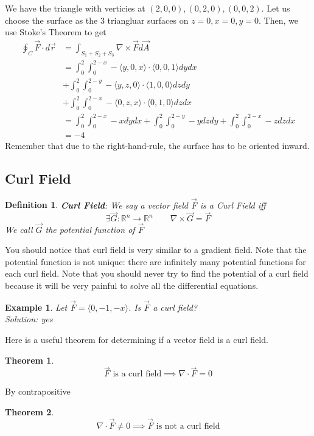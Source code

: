 \documentclass[11pt]{article}
\newtheorem{thm}{Theorem}
\newtheorem{defn}{Definition}
\newtheorem{ex}{Example}
\begin{document}
      We have the triangle with verticies at $(2,0,0), (0,2,0), (0,0,2)$. Let us choose the surface as the 3 triangluar surfaces on $z=0, x=0, y=0$. Then, we use
      Stoke's Theorem to get
      \begin{align*}
        \oint_{C} \vec{F} \cdot d\vec{r}
        &= \int_{S_{1}+S_{2}+S_{3}} \nabla \times \vec{F} d\vec{A} \\
        &=
          \int_{0}^{2}\int_{0}^{2-x} -\langle y,0,x \rangle \cdot \langle 0,0,1\rangle dy dx\\
          &+\int_{0}^{2}\int_{0}^{2-y} -\langle y,z,0 \rangle \cdot \langle 1,0,0\rangle dz dy\\
          &+\int_{0}^{2}\int_{0}^{2-x} -\langle 0,z,x \rangle \cdot \langle 0,1,0\rangle dz dx\\
        &=
          \int_{0}^{2}\int_{0}^{2-x} -x dy dx
          +\int_{0}^{2}\int_{0}^{2-y} - y dz dy
          +\int_{0}^{2}\int_{0}^{2-x} -z dz dx\\
        &= \boxed{-4}
        \end{align*}
        Remember that due to the right-hand-rule, the surface has to be oriented inward.
        \subsection{Curl Field}
        \begin{defn}
          \textbf{Curl Field}: We say a vector field $\vec{F}$ is a Curl Field iff
          \[\exists \vec{G}: \mathbb{R}^{n} \to \mathbb{R}^{n} \qquad \nabla \times \vec{G} = \vec{F}\]
          We call $\vec{G}$ the potential function of $\vec{F}$
        \end{defn}
        You should notice that curl field is very similar to a gradient field.
        Note that the potential function is not unique: there are infinitely many potential functions for
        each curl field.
        Note that you should never try to find the potential of a curl field because it will be
        very painful to solve all the differential equations.
        \begin{ex}
          Let $\vec{F} = \langle 0, -1, -x \rangle$. Is $\vec{F}$ a curl field? \\
          Solution:
yes
        \end{ex}
        Here is a useful theorem for determining if a vector field is a curl field.
        \begin{thm}
          \[\vec{F} \text{ is a curl field} \implies \nabla \cdot \vec{F} = 0\]
        \end{thm}
        By contrapositive
         \begin{thm}
          \[\nabla \cdot \vec{F} \neq 0\implies \vec{F} \text{ is not a curl field}\]
        \end{thm}
\end{document}
